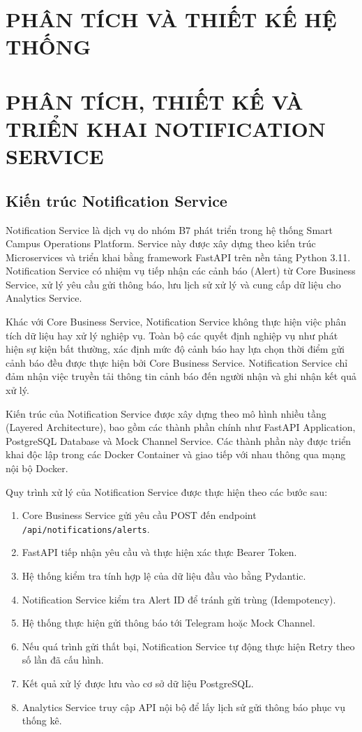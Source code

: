 \chapter{PHÂN TÍCH VÀ THIẾT KẾ HỆ THỐNG}

\chapter{PHÂN TÍCH, THIẾT KẾ VÀ TRIỂN KHAI NOTIFICATION SERVICE}

\section{Kiến trúc Notification Service}

Notification Service là dịch vụ do nhóm B7 phát triển trong hệ thống Smart Campus Operations Platform. Service này được xây dựng theo kiến trúc Microservices và triển khai bằng framework FastAPI trên nền tảng Python 3.11. Notification Service có nhiệm vụ tiếp nhận các cảnh báo (Alert) từ Core Business Service, xử lý yêu cầu gửi thông báo, lưu lịch sử xử lý và cung cấp dữ liệu cho Analytics Service.

Khác với Core Business Service, Notification Service không thực hiện việc phân tích dữ liệu hay xử lý nghiệp vụ. Toàn bộ các quyết định nghiệp vụ như phát hiện sự kiện bất thường, xác định mức độ cảnh báo hay lựa chọn thời điểm gửi cảnh báo đều được thực hiện bởi Core Business Service. Notification Service chỉ đảm nhận việc truyền tải thông tin cảnh báo đến người nhận và ghi nhận kết quả xử lý.

Kiến trúc của Notification Service được xây dựng theo mô hình nhiều tầng (Layered Architecture), bao gồm các thành phần chính như FastAPI Application, PostgreSQL Database và Mock Channel Service. Các thành phần này được triển khai độc lập trong các Docker Container và giao tiếp với nhau thông qua mạng nội bộ Docker.

Quy trình xử lý của Notification Service được thực hiện theo các bước sau:

\begin{enumerate}
\item Core Business Service gửi yêu cầu POST đến endpoint \texttt{/api/notifications/alerts}.
\item FastAPI tiếp nhận yêu cầu và thực hiện xác thực Bearer Token.
\item Hệ thống kiểm tra tính hợp lệ của dữ liệu đầu vào bằng Pydantic.
\item Notification Service kiểm tra Alert ID để tránh gửi trùng (Idempotency).
\item Hệ thống thực hiện gửi thông báo tới Telegram hoặc Mock Channel.
\item Nếu quá trình gửi thất bại, Notification Service tự động thực hiện Retry theo số lần đã cấu hình.
\item Kết quả xử lý được lưu vào cơ sở dữ liệu PostgreSQL.
\item Analytics Service truy cập API nội bộ để lấy lịch sử gửi thông báo phục vụ thống kê.
\end{enumerate}

